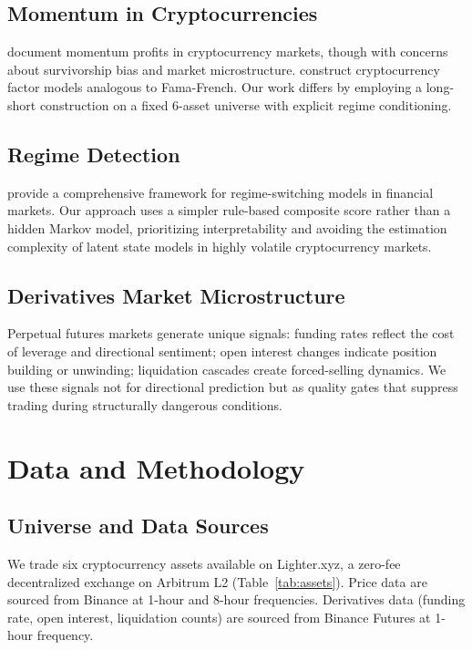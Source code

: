 \documentclass[12pt,a4paper]{article}
\begin{document}
\subsection{Momentum in Cryptocurrencies}
\citet{grobys2020momentum} document momentum profits in cryptocurrency markets, though with concerns about survivorship bias and market microstructure. \citet{liu2022risks} construct cryptocurrency factor models analogous to Fama-French. Our work differs by employing a long-short construction on a fixed 6-asset universe with explicit regime conditioning.

\subsection{Regime Detection}
\citet{ang2012regime} provide a comprehensive framework for regime-switching models in financial markets. Our approach uses a simpler rule-based composite score rather than a hidden Markov model, prioritizing interpretability and avoiding the estimation complexity of latent state models in highly volatile cryptocurrency markets.

\subsection{Derivatives Market Microstructure}
Perpetual futures markets generate unique signals: funding rates reflect the cost of leverage and directional sentiment; open interest changes indicate position building or unwinding; liquidation cascades create forced-selling dynamics. We use these signals not for directional prediction but as quality gates that suppress trading during structurally dangerous conditions.

\section{Data and Methodology}
\label{sec:method}

\subsection{Universe and Data Sources}
We trade six cryptocurrency assets available on Lighter.xyz, a zero-fee decentralized exchange on Arbitrum L2 (Table~\ref{tab:assets}). Price data are sourced from Binance at 1-hour and 8-hour frequencies. Derivatives data (funding rate, open interest, liquidation counts) are sourced from Binance Futures at 1-hour frequency.
\end{document}
